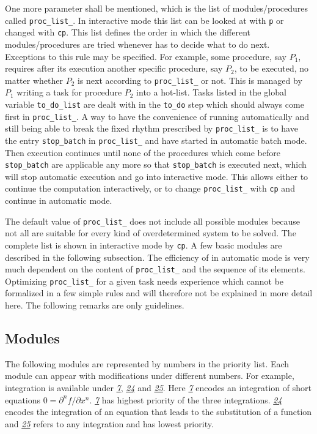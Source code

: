 One more parameter shall be mentioned, which is the list of
modules/procedures called \texttt{proc\_list\_}.  In interactive mode
this list can be looked at with \texttt{p} or changed with
\texttt{cp}.  This list defines the order in which the different
modules/procedures are tried whenever  has to decide
what to do next.  Exceptions to this rule may be specified.  For
example, some procedure, say $P_1$, requires after its execution
another specific procedure, say $P_2$, to be executed, no matter
whether $P_2$ is next according to \texttt{proc\_list\_} or not.  This
is managed by $P_1$ writing a task for procedure $P_2$ into a
hot-list.  Tasks listed in the global variable \texttt{to\_do\_list}
are dealt with in the \texttt{to\_do} step which should always come
first in \texttt{proc\_list\_}.  A way to have the convenience of
running  automatically and still being able to break
the fixed rhythm prescribed by \texttt{proc\_list\_} is to have the entry
\texttt{stop\_batch} in \texttt{proc\_list\_} and have 
started in automatic batch mode.  Then execution continues until none
of the procedures which come before \texttt{stop\_batch} are
applicable any more so that \texttt{stop\_batch} is executed next,
which will stop automatic execution and go into interactive mode.
This allows either to continue the computation interactively, or to
change \texttt{proc\_list\_} with \texttt{cp} and continue in
automatic mode.

The default value of \texttt{proc\_list\_} does not include all
possible modules because not all are suitable for every kind of
overdetermined system to be solved.  The complete list is shown in
interactive mode by \texttt{cp}.  A few basic modules are described in
the following subsection.  The efficiency of  in automatic
mode is very much dependent on the content of \texttt{proc\_list\_}
and the sequence of its elements.  Optimizing \texttt{proc\_list\_}
for a given task needs experience which cannot be formalized in a few
simple rules and will therefore not be explained in more detail here.
The following remarks are only guidelines.

\subsection{Modules}

The following modules are represented by numbers in the priority list.
Each module can appear with modifications under different numbers.
For example, integration is available under
\hyperlink{crack-m_7}{\emph{7}}, \hyperlink{crack-m_24}{\emph{24}} and
\hyperlink{crack-m_25}{\emph{25}}.  Here \hyperlink{crack-m_7}{\emph{7}}
encodes an integration of short equations $0=\partial^n f/\partial
x^n$.  \hyperlink{crack-m_7}{\emph{7}} has highest priority of the
three integrations.  \hyperlink{crack-m_24}{\emph{24}} encodes the
integration of an equation that leads to the substitution of a
function and \hyperlink{crack-m_25}{\emph{25}} refers to any
integration and has lowest priority.

